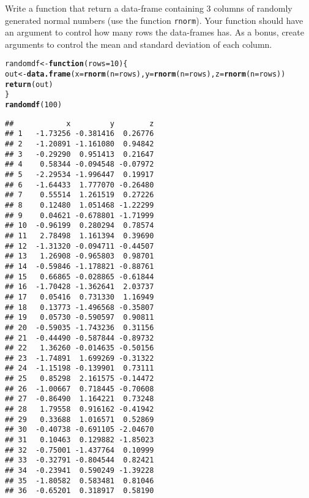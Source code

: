 \documentclass[12pt,a4paper]{scrartcl}\usepackage[]{graphicx}\usepackage[]{color}
\makeatletter
\newcommand{\hlnum}[1]{\textcolor[rgb]{0.686,0.059,0.569}{#1}}%
\newcommand{\hlstd}[1]{\textcolor[rgb]{0.345,0.345,0.345}{#1}}%
\newcommand{\hlkwa}[1]{\textcolor[rgb]{0.161,0.373,0.58}{\textbf{#1}}}%
\newcommand{\hlkwb}[1]{\textcolor[rgb]{0.69,0.353,0.396}{#1}}%
\newcommand{\hlkwc}[1]{\textcolor[rgb]{0.333,0.667,0.333}{#1}}%
\newcommand{\hlkwd}[1]{\textcolor[rgb]{0.737,0.353,0.396}{\textbf{#1}}}%
\newenvironment{kframe}{%
 \def\at@end@of@kframe{}%
 \ifinner\ifhmode%
  \def\at@end@of@kframe{\end{minipage}}%
  \begin{minipage}{\columnwidth}%
 \fi\fi%
 \def\FrameCommand##1{\hskip\@totalleftmargin \hskip-\fboxsep
 \colorbox{shadecolor}{##1}\hskip-\fboxsep
     \hskip-\linewidth \hskip-\@totalleftmargin \hskip\columnwidth}%
 \MakeFramed {\advance\hsize-\width
   \@totalleftmargin\z@ \linewidth\hsize
   \@setminipage}}%
 {\par\unskip\endMakeFramed%
 \at@end@of@kframe}
\newenvironment{knitrout}{}{} %
\makeatother
\begin{document}
\begin{Exercise}[difficulty=2, title={Write a data-frame of random values in output}]
Write a function that return a data-frame containing 3 columns of randomly generated normal numbers (use the function \texttt{rnorm}). Your function should have an argument to control how many rows the data-frames has. As a bonus, create arguments to control the mean and standard deviation of each column.
\end{Exercise}
\begin{Answer}
\begin{knitrout}
\color{fgcolor}\begin{kframe}
\begin{alltt}
\hlstd{randomdf} \hlkwb{<-} \hlkwa{function}\hlstd{(}\hlkwc{rows}\hlstd{=}\hlnum{10}\hlstd{)\{}
  \hlstd{out} \hlkwb{<-} \hlkwd{data.frame}\hlstd{(}\hlkwc{x} \hlstd{=} \hlkwd{rnorm}\hlstd{(}\hlkwc{n}\hlstd{=rows),} \hlkwc{y}\hlstd{=} \hlkwd{rnorm}\hlstd{(}\hlkwc{n}\hlstd{=rows),} \hlkwc{z} \hlstd{=} \hlkwd{rnorm}\hlstd{(}\hlkwc{n}\hlstd{=rows))}
  \hlkwd{return}\hlstd{(out)}
\hlstd{\}}
\hlkwd{randomdf}\hlstd{(}\hlnum{100}\hlstd{)}
\end{alltt}
\begin{verbatim}
##            x         y        z
## 1   -1.73256 -0.381416  0.26776
## 2   -1.20891 -1.161080  0.94842
## 3   -0.29290  0.951413  0.21647
## 4    0.58344 -0.094548 -0.07972
## 5   -2.29534 -1.996447  0.19917
## 6   -1.64433  1.777070 -0.26480
## 7    0.55514  1.261519  0.27226
## 8    0.12480  1.051468 -1.22299
## 9    0.04621 -0.678801 -1.71999
## 10  -0.96199  0.280294  0.78574
## 11   2.78498  1.161394  0.39690
## 12  -1.31320 -0.094711 -0.44507
## 13   1.26908 -0.965803  0.98701
## 14  -0.59846 -1.178821 -0.88761
## 15   0.66865 -0.028865 -0.61844
## 16  -1.70428 -1.362641  2.03737
## 17   0.05416  0.731330  1.16949
## 18   0.13773 -1.496568 -0.35807
## 19   0.05730 -0.590597  0.90811
## 20  -0.59035 -1.743236  0.31156
## 21  -0.44490 -0.587844 -0.89732
## 22   1.36260 -0.014635 -0.50156
## 23  -1.74891  1.699269 -0.31322
## 24  -1.15198 -0.139901  0.73111
## 25   0.85298  2.161575 -0.14472
## 26  -1.00667  0.718445 -0.70608
## 27  -0.86490  1.164221  0.73248
## 28   1.79558  0.916162 -0.41942
## 29   0.33688  1.016571  0.52869
## 30  -0.40738 -0.691105 -2.04670
## 31   0.10463  0.129882 -1.85023
## 32  -0.75001 -1.437764  0.10999
## 33  -0.32791 -0.804544  0.82421
## 34  -0.23941  0.590249 -1.39228
## 35  -1.80582  0.583481  0.81046
## 36  -0.65201  0.318917  0.58190

\end{verbatim}
\end{kframe}
\end{knitrout}
\end{Answer}
\end{document}

